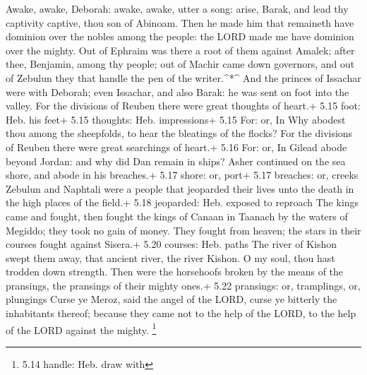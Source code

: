  Awake, awake, Deborah: awake, awake, utter a song: arise,
Barak, and lead thy captivity captive, thou son of Abinoam.
 Then he made him that remaineth have dominion over the
nobles among the people: the LORD made me have dominion over the mighty.
 Out of Ephraim was there a root of them against Amalek;
after thee, Benjamin, among thy people; out of Machir came down
governors, and out of Zebulun they that handle the pen of the
writer.\^{}*\^{}  And the princes of Issachar were with
Deborah; even Issachar, and also Barak: he was sent on foot into the
valley. For the divisions of Reuben there were great thoughts of heart.+
5.15 foot: Heb. his feet+ 5.15 thoughts: Heb. impressions+ 5.15 For: or,
In  Why abodest thou among the sheepfolds, to hear the
bleatings of the flocks? For the divisions of Reuben there were great
searchings of heart.+ 5.16 For: or, In  Gilead abode beyond
Jordan: and why did Dan remain in ships? Asher continued on the sea
shore, and abode in his breaches.+ 5.17 shore: or, port+ 5.17 breaches:
or, creeks  Zebulun and Naphtali were a people that
jeoparded their lives unto the death in the high places of the field.+
5.18 jeoparded: Heb. exposed to reproach  The kings came
and fought, then fought the kings of Canaan in Taanach by the waters of
Megiddo; they took no gain of money.  They fought from
heaven; the stars in their courses fought against Sisera.+ 5.20 courses:
Heb. paths  The river of Kishon swept them away, that
ancient river, the river Kishon. O my soul, thou hast trodden down
strength.  Then were the horsehoofs broken by the means of
the pransings, the pransings of their mighty ones.+ 5.22 pransings: or,
tramplings, or, plungings  Curse ye Meroz, said the angel
of the LORD, curse ye bitterly the inhabitants thereof; because they
came not to the help of the LORD, to the help of the LORD against the
mighty. \footnote{5.14 handle: Heb. draw with}

